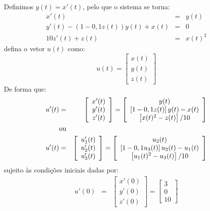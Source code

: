 \begin{resol}
 Definimos $y(t)=x'(t)$, pelo que o sistema se torna:
\begin{eqnarray*}
x'(t)&=&y(t)\\
y'(t)-(1- 0,1 z(t))y(t)+ x(t)&=&0\\
10 z'(t)+z(t)&=&x(t)^2
\end{eqnarray*}
 defina o vetor $u(t)$ como:
$$u(t)=\left[
\begin{array}{c}
 x(t)\\y(t)\\z(t)
\end{array}
\right]$$ 
De forma que:
\begin{eqnarray*}
u'(t)&=&\left[
\begin{array}{c}
 x'(t)\\y'(t)\\z'(t)
\end{array}
\right]=\left[
\begin{array}{c}
 y(t)\\
 \left[1- 0,1 z(t)\right]y(t)- x(t)\\
 \left[x(t)^2-z(t)\right]/10
\end{array}
\right]\\
&\hbox{ou}&\\
u'(t)&=&\left[
\begin{array}{c}
 u_1'(t)\\u_2'(t)\\u_3'(t)
\end{array}
\right]=\left[
\begin{array}{c}
 u_2(t)\\
 \left[1- 0,1 u_3(t)\right]u_2(t)- u_1(t)\\
 \left[u_1(t)^2-u_3(t)\right]/10
\end{array}
\right]
\end{eqnarray*}
sujeito às condições iniciais dadas por:
\begin{eqnarray*}
u'(0)&=&\left[
\begin{array}{c}
 x'(0)\\y'(0)\\z'(0)
\end{array}
\right]=\left[
\begin{array}{c}
3\\0\\10
\end{array}
\right]
\end{eqnarray*}

\end{resol}



